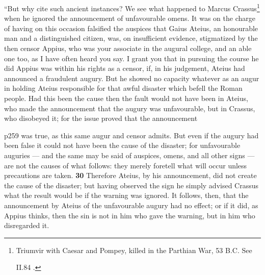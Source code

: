 ``But why cite such ancient instances? We see what happened to Marcus Crassus\texthebrew{}\footnote{Triumvir with Caesar and Pompey, killed in the Parthian War, 53 B.C. See

II.84 .

} when he ignored the announcement of unfavourable omens. It was on the charge of having on this occasion falsified the auspices that Gaius Ateius, an honourable man and a distinguished citizen, was, on insufficient evidence, stigmatized by the then censor Appius, who was your associate in the augural college, and an able one too, as I have often heard you say. I grant you that in pursuing the course he did Appius was within his rights as a censor, if, in his judgement, Ateius had announced a fraudulent augury. But he showed no capacity whatever as an augur in holding Ateius responsible for that awful disaster which befell the Roman people. Had this been the cause then the fault would not have been in Ateius, who made the announcement that the augury was unfavourable, but in Crassus, who disobeyed it; for the issue proved that the announcement

p259 was true, as this same augur and censor admits. But even if the augury had been false it could not have been the cause of the disaster; for unfavourable auguries \texthebrew{—} and the same may be said of auspices, omens, and all other signs \texthebrew{—} are not the causes of what follows: they merely foretell what will occur unless precautions are taken. \textbf{30} Therefore Ateius, by his announcement, did not create the cause of the disaster; but having observed the sign he simply advised Crassus what the result would be if the warning was ignored. It follows, then, that the announcement by Ateius of the unfavourable augury had no effect; or if it did, as Appius thinks, then the sin is not in him who gave the warning, but in him who disregarded it.

